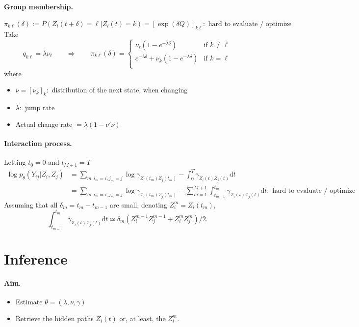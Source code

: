 \documentclass[a4paper, 12pt]{article}
\newcommand{\dd}{\text{d}}
\newcommand{\kl}{{k\ell}}
\begin{document}
\paragraph{Group membership.} 
$$
\pi_\kl(\delta) := P(Z_i(t+\delta) = \ell | Z_i(t) = k) = \left[ \exp(\delta Q) \right]_\kl
: \text{ hard to evaluate / optimize}
$$
Take 
$$
q_\kl = \lambda \nu_\ell
\qquad \Rightarrow \qquad
\pi_\kl(\delta) = \left\{
  \begin{array}{ll}
   \nu_\ell (1 - e^{-\lambda \delta}) & \text{if } k \neq \ell \\
   e^{-\lambda \delta} + \nu_k (1 - e^{-\lambda \delta}) & \text{if } k = \ell \\
  \end{array}
\right.
$$ 
where
\begin{itemize}
 \item $\nu = [\nu_k]_k:$ distribution of the next state, when changing
 \item $\lambda:$ jump rate
 \item Actual change rate $= \lambda (1 - \nu' \nu)$
\end{itemize}

\paragraph{Interaction process.} Letting $t_0 = 0$ and $t_{M+1} = T$
\begin{align*}
 \log p_\theta(Y_{ij} | Z_i, Z_j)
 & = \sum_{m: i_m=i, j_m=j} \log \gamma_{Z_i(t_m) Z_j(t_m)} 
 - \int_0^T \gamma_{Z_i(t) Z_j(t)} \dd t \\
 & = \sum_{m: i_m=i, j_m=j} \log \gamma_{Z_i(t_m) Z_j(t_m)} 
 - \sum_{m=1}^{M+1} \int_{t_{m-1}}^{t_m} \gamma_{Z_i(t) Z_j(t)} \dd t
 : \text{ hard to evaluate / optimize}
\end{align*}
Assuming that all $\delta_m = t_m - t_{m-1}$ are small, denoting $Z_i^m = Z_i(t_m)$,
$$
\int_{t_{m-1}}^{t_m} \gamma_{Z_i(t) Z_j(t)} \dd t
\simeq \delta_m (Z_i^{m-1} Z_j^{m-1} + Z_i^m Z_j^m) / 2.
$$

\newpage
\section{Inference}

\paragraph{Aim.}
\begin{itemize}
 \item Estimate $\theta = (\lambda, \nu, \gamma)$
 \item Retrieve the hidden paths $Z_i(t)$ or, at least, the $Z_i^m$.
\end{itemize}
\end{document}
